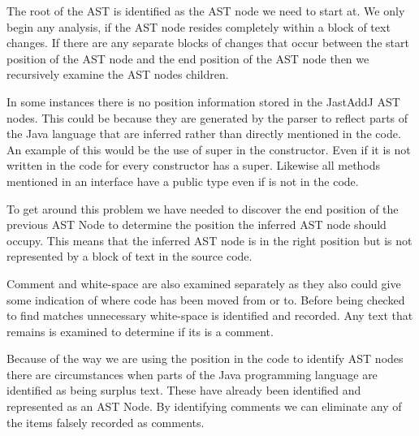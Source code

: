 The root of the AST is identified as the AST node we need to start at. 
We only begin any analysis, if the AST node resides completely within a block of text changes.
If there are any separate blocks of changes that occur between the start position of the AST node and the end position of the AST node then we recursively examine the AST nodes children.

% 
% 



In some instances there is no position information stored in the JastAddJ AST nodes.  This could be because they are generated by the parser to reflect parts of the Java language that are inferred rather than directly mentioned in the code.  An example of this would be the use of super in the constructor.  Even if it is not written in the code for every constructor has a super. Likewise all methods mentioned in an interface have a public type even if is not in the code.

To get around this problem we have needed to discover the end position of the previous AST Node to determine the position the inferred AST node should occupy.  This means that the inferred AST node is in the right position but is not represented by a block of text in the source code. 

Comment and white-space are also examined separately as they also could give some indication of where code has been moved from or to.
Before being checked to find matches unnecessary white-space is identified and recorded.
Any text that remains is examined to determine if its is a comment. 

Because of the way we are using the position in the code to identify AST nodes there are circumstances when parts of the Java programming language are identified as being surplus text. These have already been identified and represented as an AST Node. By identifying comments we can eliminate any of the items falsely recorded as comments.

